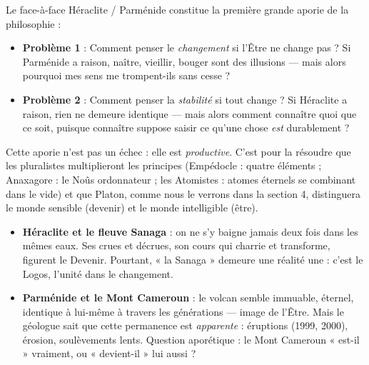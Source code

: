 \documentclass[11pt]{article}
\begin{document}
Le face-à-face Héraclite / Parménide constitue la première grande aporie de la philosophie :
\begin{itemize}
\item \textbf{Problème 1} : Comment penser le \emph{changement} si l'Être ne change pas ? Si Parménide a raison, naître, vieillir, bouger sont des illusions — mais alors pourquoi mes sens me trompent-ils sans cesse ?
\item \textbf{Problème 2} : Comment penser la \emph{stabilité} si tout change ? Si Héraclite a raison, rien ne demeure identique — mais alors comment connaître quoi que ce soit, puisque connaître suppose saisir ce qu'une chose \emph{est} durablement ?
\end{itemize}

Cette aporie n'est pas un échec : elle est \emph{productive}. C'est pour la résoudre que les pluralistes multiplieront les principes (Empédocle : quatre éléments ; Anaxagore : le Noûs ordonnateur ; les Atomistes : atomes éternels se combinant dans le vide) et que Platon, comme nous le verrons dans la section 4, distinguera le monde sensible (devenir) et le monde intelligible (être).

\begin{exemplebox}
\begin{itemize}
\item \textbf{Héraclite et le fleuve Sanaga} : on ne s'y baigne jamais deux fois dans les mêmes eaux. Ses crues et décrues, son cours qui charrie et transforme, figurent le Devenir. Pourtant, « la Sanaga » demeure une réalité une : c'est le Logos, l'unité dans le changement.
\item \textbf{Parménide et le Mont Cameroun} : le volcan semble immuable, éternel, identique à lui-même à travers les générations — image de l'Être. Mais le géologue sait que cette permanence est \emph{apparente} : éruptions (1999, 2000), érosion, soulèvements lents. Question aporétique : le Mont Cameroun « est-il » vraiment, ou « devient-il » lui aussi ?
\end{itemize}
\end{exemplebox}
\end{document}
